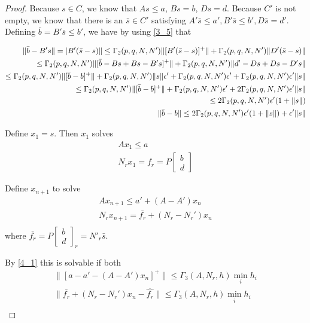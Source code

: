 \begin{proof}
Because $s \in C$, we know that $As \le a$, $Bs = b$, $Ds = d$.
Because $C'$ is not empty, we know that there is an $\bar s  \in C'$ satisfying $A'\bar s \le a', B'\bar s \le b', D\bar s = d'$.
Defining $\bar b = B'\bar s \le b'$, we have by using \cref{3_5} that

\begin{align*}
\|\bar b - B's\| = \-|B'(\bar s - s)\| \le \Gamma_2(p, q, N, N') \|[B'(\bar s - s)]^+\| + \Gamma_2(p, q, N, N') \|D'(\bar s - s)\| \\
\le \Gamma_2(p, q, N, N') \|[\bar b - Bs + Bs - B's]^+\| + \Gamma_2(p, q, N, N') \|d' - Ds + Ds - D's\| \\
\le \Gamma_2(p, q, N, N')\|[\bar b - b ]^+\| + \Gamma_2(p, q, N, N') \|s\|\epsilon' + \Gamma_2(p, q, N, N') \epsilon' + \Gamma_2(p, q, N, N') \epsilon' \|s\| \\
\le \Gamma_2(p, q, N, N') \|[\bar b - b ]^+\| + \Gamma_2(p, q, N, N') \epsilon' + 2\Gamma_2(p, q, N, N')\epsilon'\|s\| \\
\le 2 \Gamma_2(p, q, N, N') \epsilon'(1 + \|s\|) \\
\|\bar b - b\|\le 2\Gamma_2(p, q, N, N') \epsilon'(1 + \|s\|) + \epsilon' \|s\| \\
\end{align*}

Define $x_1 = s$. Then $x_1$ solves 
\begin{align*}
Ax_1 \le a \\
N_r x_1 = f_r = P\begin{bmatrix} b \\ d \end{bmatrix}
\end{align*}

Define $x_{n+1}$ to solve
\begin{align*}
A x_{n+1} \le a' + (A - A') x_n \\
N_r x_{n+1} = \bar {f_r} + (N_r - N_r')x_{n} \\
\end{align*}
where
$\bar {f_r} = P\begin{bmatrix} b \\ d \end{bmatrix}_r =  N'_r\bar s$.

By \cref{4_1} this is solvable if both
\begin{align*}
\|[a - a' - (A - A')x_n]^+\| \le \Gamma_3(A, N_r, h) \min_i h_i \\
\|\bar {f_r} + (N_r - N_r')x_n - \hat{f_r} \| \le \Gamma_3(A, N_r, h) \min_i h_i \\
\end{align*}


\end{proof}
